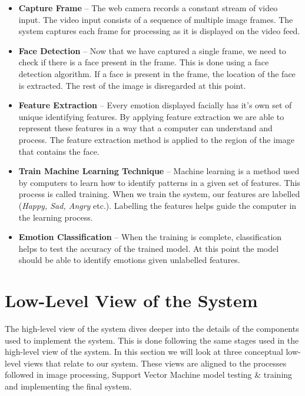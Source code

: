 \begin{itemize}
  \item \textbf{Capture Frame} -- The web camera records a constant stream of video input. The video input consists of a sequence of multiple image frames. The system captures each frame for processing as it is displayed on the video feed.

  \item \textbf{Face Detection} -- Now that we have captured a single frame, we need to check if there is a face present in the frame. This is done using a face detection algorithm. If a face is present in the frame, the location of the face is extracted. The rest of the image is disregarded at this point.

  \item \textbf{Feature Extraction} -- Every emotion displayed facially has it's own set of unique identifying features. By applying feature extraction we are able to represent these features in a way that a computer can understand and process. The feature extraction method is applied to the region of the image that contains the face.

  \item \textbf{Train Machine Learning Technique} -- Machine learning is a method used by computers to learn how to identify patterns in a given set of features. This process is called training. When we train the system, our features are labelled (\textit{Happy, Sad, Angry} etc.). Labelling the features helps guide the computer in the learning process.

  \item \textbf{Emotion Classification} -- When the training is complete, classification helps to test the accuracy of the trained model. At this point the model should be able to identify emotions given unlabelled features.
\end{itemize}

\section{Low-Level View of the System}\label{sec:lowlevel}
The high-level view of the system dives deeper into the details of the components used to implement the system. This is done following the same stages used in the high-level view of the system. In this section we will look at three conceptual low-level views that relate to our system. These views are aligned to the processes followed in image processing, Support Vector Machine model testing \& training and implementing the final system.
